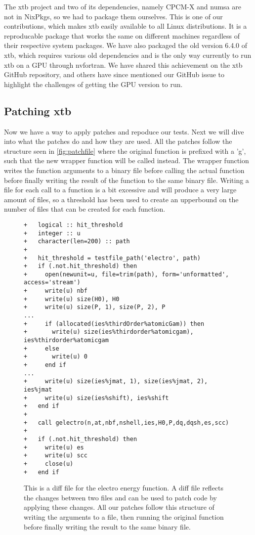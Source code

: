 The xtb project and two of its dependencies, namely CPCM-X and numsa are not in NixPkgs, so we had to package them ourselves. This is one of our contributions, which makes xtb easily available to all Linux distributions. It is a reproducable package that works the same on different machines regardless of their respective system packages. We have also packaged the old version 6.4.0 of xtb, which requires various old dependencies and is the only way currently to run xtb on a GPU through nvfortran. We have shared this achievement on the xtb GitHub repository, and others have since mentioned our GitHub issue to highlight the challenges of getting the GPU version to run.

\subsection{Patching xtb}

Now we have a way to apply patches and repoduce our tests. Next we will dive into what the patches do and how they are used.
All the patches follow the structure seen in \autoref{fig:patchfile} where the original function is prefixed with a 'g', such that the new wrapper function will be called instead. The wrapper function writes the function arguments to a binary file before calling the actual function before finally writing the result of the function to the same binary file.
Writing a file for each call to a function is a bit excessive and will produce a very large amount of files, so a threshold has been used to create an upperbound on the number of files that can be created for each function.

\begin{figure}[H]
\begin{verbatim}
+   logical :: hit_threshold
+   integer :: u
+   character(len=200) :: path
+
+   hit_threshold = testfile_path('electro', path)
+   if (.not.hit_threshold) then
+     open(newunit=u, file=trim(path), form='unformatted', access='stream')
+     write(u) nbf
+     write(u) size(H0), H0
+     write(u) size(P, 1), size(P, 2), P
...
+     if (allocated(ies%thirdOrder%atomicGam)) then
+       write(u) size(ies%thirdorder%atomicgam), ies%thirdorder%atomicgam
+     else
+       write(u) 0
+     end if
...
+     write(u) size(ies%jmat, 1), size(ies%jmat, 2), ies%jmat
+     write(u) size(ies%shift), ies%shift
+   end if
+
+   call gelectro(n,at,nbf,nshell,ies,H0,P,dq,dqsh,es,scc)
+
+   if (.not.hit_threshold) then
+     write(u) es
+     write(u) scc
+     close(u)
+   end if
\end{verbatim}
\caption{This is a diff file for the electro energy function. A diff file reflects the changes between two files and can be used to patch code by applying these changes. All our patches follow this structure of writing the arguments to a file, then running the original function before finally writing the result to the same binary file.}
\label{fig:patchfile}
\end{figure}

